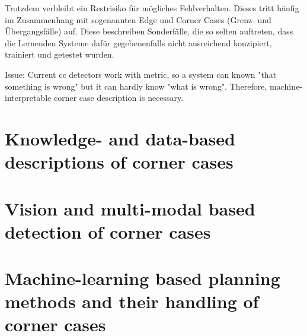 \begin{displayquote}
Trotzdem verbleibt ein Restrisiko für mögliches Fehlverhalten. Dieses tritt häufig im Zusammenhang mit sogenannten Edge und Corner Cases (Grenz- und Übergangsfälle) auf. Diese beschreiben Sonderfälle, die so selten auftreten, dass die Lernenden Systeme dafür gegebenenfalls nicht ausreichend konzipiert, trainiert und getestet wurden.
\end{displayquote}

Issue: Current cc detectors work with metric, so a system can known "that something is wrong" but it can hardly know "what is wrong". Therefore, machine-interpretable corner case description is necessary.

\section{Knowledge- and data-based descriptions of corner cases}

\section{Vision and multi-modal based detection of corner cases}

\section{Machine-learning based planning methods and their handling of corner cases}




